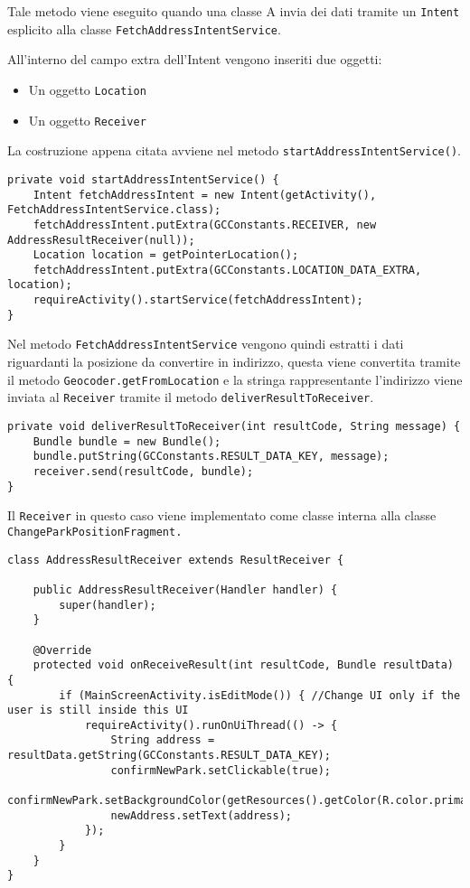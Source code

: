 Tale metodo viene eseguito quando una classe A invia dei dati tramite un
\texttt{Intent} esplicito alla classe
\texttt{FetchAddressIntentService}.

All'interno del campo extra dell'Intent vengono inseriti due oggetti:

\begin{itemize}

\item
  Un oggetto \texttt{Location}
\item
  Un oggetto \texttt{Receiver}
\end{itemize}

La costruzione appena citata avviene nel metodo
\texttt{startAddressIntentService()}.

\begin{lstlisting}
private void startAddressIntentService() {
    Intent fetchAddressIntent = new Intent(getActivity(), FetchAddressIntentService.class);
    fetchAddressIntent.putExtra(GCConstants.RECEIVER, new AddressResultReceiver(null));
    Location location = getPointerLocation();
    fetchAddressIntent.putExtra(GCConstants.LOCATION_DATA_EXTRA, location);
    requireActivity().startService(fetchAddressIntent);
}
\end{lstlisting}


Nel metodo \texttt{FetchAddressIntentService} vengono quindi estratti i
dati riguardanti la posizione da convertire in indirizzo, questa viene
convertita tramite il metodo \texttt{Geocoder.getFromLocation} e la
stringa rappresentante l'indirizzo viene inviata al \texttt{Receiver}
tramite il metodo \texttt{deliverResultToReceiver}.

\begin{lstlisting}
private void deliverResultToReceiver(int resultCode, String message) {
    Bundle bundle = new Bundle();
    bundle.putString(GCConstants.RESULT_DATA_KEY, message);
    receiver.send(resultCode, bundle);
}
\end{lstlisting}


Il \texttt{Receiver} in questo caso viene implementato come classe
interna alla classe \texttt{ChangeParkPositionFragment.}

\begin{lstlisting}
class AddressResultReceiver extends ResultReceiver {

    public AddressResultReceiver(Handler handler) {
        super(handler);
    }

    @Override
    protected void onReceiveResult(int resultCode, Bundle resultData) {
        if (MainScreenActivity.isEditMode()) { //Change UI only if the user is still inside this UI
            requireActivity().runOnUiThread(() -> {
                String address = resultData.getString(GCConstants.RESULT_DATA_KEY);
                confirmNewPark.setClickable(true);
                confirmNewPark.setBackgroundColor(getResources().getColor(R.color.primaryGreen));
                newAddress.setText(address);
            });
        }
    }
}
\end{lstlisting}

